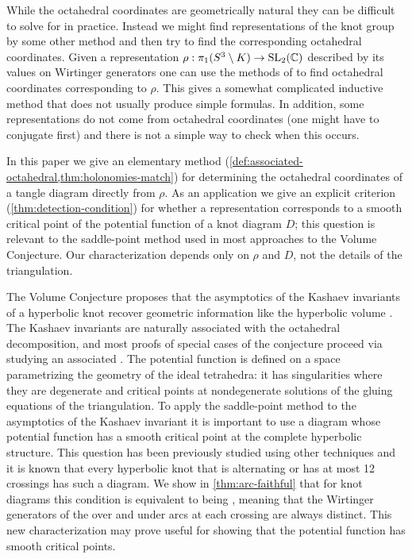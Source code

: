 \documentclass[leqno]{sl2art}
\begin{document}
While the octahedral coordinates are geometrically natural they can be difficult to solve for in practice.
Instead we might find representations of the knot group by some other method and then try to find the corresponding octahedral coordinates.
Given a representation \(\rho : \pi_1(S^3 \setminus K) \to \operatorname{SL}_2(\mathbb{C})\) described by its values on Wirtinger generators one can use the methods of \citeauthor{Blanchet2018} \cite{Blanchet2018} to find octahedral coordinates corresponding to \(\rho\).
This gives a somewhat complicated inductive method that does not usually produce simple formulas.
In addition, some representations do not come from octahedral coordinates (one might have to conjugate first) and there is not a simple way to check when this occurs.

In this paper we give an elementary method (\cref{def:associated-octahedral,thm:holonomies-match}) for determining the octahedral coordinates of a tangle diagram directly from \(\rho\).
As an application we give an explicit criterion (\cref{thm:detection-condition}) for whether a representation corresponds to a smooth critical point of the potential function of a knot diagram \(D\);
this question is relevant to the saddle-point method used in most approaches to the Volume Conjecture.
Our characterization depends only on \(\rho\) and \(D\), not the details of the triangulation.

%
%
%
The Volume Conjecture proposes that the asymptotics of the Kashaev invariants of a hyperbolic knot recover geometric information like the hyperbolic volume \cite{Kashaev1997}.
The Kashaev invariants are naturally associated with the octahedral decomposition, and most proofs of special cases of the conjecture proceed via studying an associated  \cite{Yokota2000}.
The potential function is defined on a space parametrizing the geometry of the ideal tetrahedra: it has singularities where they are degenerate and critical points at nondegenerate solutions of the gluing equations of the triangulation.
To apply the saddle-point method to the asymptotics of the Kashaev invariant it is important to use a diagram whose potential function has a smooth critical point at the complete hyperbolic structure.
This question has been previously studied using other techniques \cite{Sakuma2018,Garoufalidis2016} and it is known that every hyperbolic knot that is alternating or has at most 12 crossings has such a diagram.
We show in \cref{thm:arc-faithful} that for knot diagrams this condition is equivalent to being  , meaning that the Wirtinger generators of the over and under arcs at each crossing are always distinct.
This new characterization may prove useful for showing that the potential function has smooth critical points.
\end{document}
